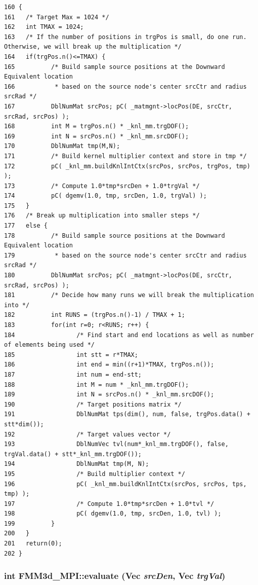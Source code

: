 \footnotesize\begin{verbatim}160 {
161   /* Target Max = 1024 */
162   int TMAX = 1024;
163   /* If the number of positions in trgPos is small, do one run.  Otherwise, we will break up the multiplication */
164   if(trgPos.n()<=TMAX) {
165          /* Build sample source positions at the Downward Equivalent location
166           * based on the source node's center srcCtr and radius srcRad */
167          DblNumMat srcPos; pC( _matmgnt->locPos(DE, srcCtr, srcRad, srcPos) );
168          int M = trgPos.n() * _knl_mm.trgDOF();
169          int N = srcPos.n() * _knl_mm.srcDOF();
170          DblNumMat tmp(M,N);
171          /* Build kernel multiplier context and store in tmp */
172          pC( _knl_mm.buildKnlIntCtx(srcPos, srcPos, trgPos, tmp) );
173          /* Compute 1.0*tmp*srcDen + 1.0*trgVal */
174          pC( dgemv(1.0, tmp, srcDen, 1.0, trgVal) );
175   }
176   /* Break up multiplication into smaller steps */
177   else {
178          /* Build sample source positions at the Downward Equivalent location
179           * based on the source node's center srcCtr and radius srcRad */
180          DblNumMat srcPos; pC( _matmgnt->locPos(DE, srcCtr, srcRad, srcPos) );
181          /* Decide how many runs we will break the multiplication into */
182          int RUNS = (trgPos.n()-1) / TMAX + 1;
183          for(int r=0; r<RUNS; r++) {
184                 /* Find start and end locations as well as number of elements being used */
185                 int stt = r*TMAX;
186                 int end = min((r+1)*TMAX, trgPos.n());
187                 int num = end-stt;
188                 int M = num * _knl_mm.trgDOF();
189                 int N = srcPos.n() * _knl_mm.srcDOF();
190                 /* Target positions matrix */
191                 DblNumMat tps(dim(), num, false, trgPos.data() + stt*dim());
192                 /* Target values vector */
193                 DblNumVec tvl(num*_knl_mm.trgDOF(), false, trgVal.data() + stt*_knl_mm.trgDOF());
194                 DblNumMat tmp(M, N);
195                 /* Build multiplier context */
196                 pC( _knl_mm.buildKnlIntCtx(srcPos, srcPos, tps, tmp) );
197                 /* Compute 1.0*tmp*srcDen + 1.0*tvl */
198                 pC( dgemv(1.0, tmp, srcDen, 1.0, tvl) );
199          }
200   }
201   return(0);
202 }
\end{verbatim}\normalsize 


\subsubsection{\setlength{\rightskip}{0pt plus 5cm}int FMM3d\_\-MPI::evaluate (Vec {\em src\-Den}, Vec {\em trg\-Val})\hspace{0.3cm}{\tt  [virtual]}}\label{classFMM3d__MPI_8db45026f69e4b2b504f0c491c170d7d_8db45026f69e4b2b504f0c491c170d7d}


